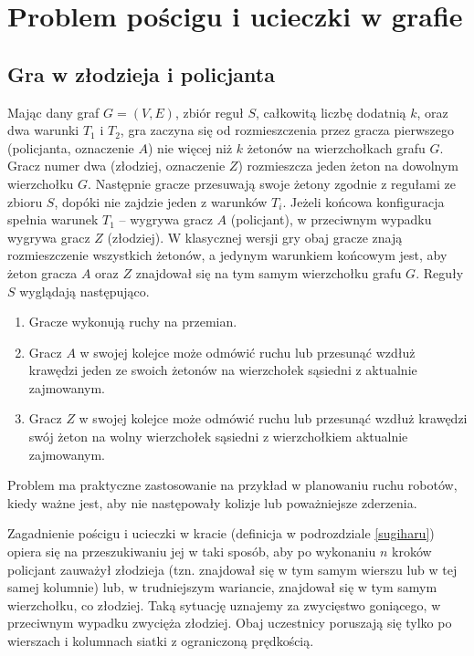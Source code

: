 \documentclass{xmgr}
\theoremstyle{definition}
\begin{document}
\chapter{Problem pościgu i ucieczki w grafie}
\section{Gra w złodzieja i policjanta}\label{sec:poscig}
Mając dany graf $G=(V,E)$, zbiór reguł $S$, całkowitą liczbę dodatnią $k$, oraz dwa warunki $T_1$ i $T_2$, gra zaczyna się od rozmieszczenia przez gracza pierwszego (policjanta, oznaczenie $A$) nie więcej niż $k$ żetonów na wierzchołkach grafu $G$. Gracz numer dwa (złodziej, oznaczenie $Z$) rozmieszcza jeden żeton na dowolnym wierzchołku $G$. Następnie gracze przesuwają swoje żetony zgodnie z regułami ze zbioru $S$, dopóki nie zajdzie jeden z warunków $T_i$. Jeżeli końcowa konfiguracja spełnia warunek $T_1$ -- wygrywa gracz $A$ (policjant), w przeciwnym wypadku wygrywa gracz $Z$ (złodziej). W klasycznej wersji gry \cite{aigner} obaj gracze znają rozmieszczenie wszystkich żetonów, a jedynym warunkiem końcowym jest, aby żeton gracza $A$ oraz $Z$ znajdował się na tym samym wierzchołku grafu $G$.
Reguły $S$ wyglądają następująco.
\begin{enumerate}
  \item Gracze wykonują ruchy na przemian.
  \item Gracz $A$ w swojej kolejce może odmówić ruchu lub przesunąć wzdłuż krawędzi jeden ze swoich żetonów na wierzchołek sąsiedni z aktualnie zajmowanym.
  \item Gracz $Z$ w swojej kolejce może odmówić ruchu lub przesunąć wzdłuż krawędzi swój żeton na wolny wierzchołek sąsiedni z wierzchołkiem aktualnie zajmowanym.
\end{enumerate}

Problem ma praktyczne zastosowanie na przykład w planowaniu ruchu robotów, kiedy ważne jest, aby nie następowały kolizje lub poważniejsze zderzenia.

Zagadnienie pościgu i ucieczki w kracie (definicja w podrozdziale \ref{sugiharu}) opiera się na przeszukiwaniu jej w taki sposób, aby po wykonaniu $n$ kroków policjant zauważył złodzieja (tzn. znajdował się w tym samym wierszu lub w tej samej kolumnie) lub, w trudniejszym wariancie, znajdował się w tym samym wierzchołku, co złodziej. Taką sytuację uznajemy za zwycięstwo goniącego, w przeciwnym wypadku zwycięża złodziej. Obaj uczestnicy poruszają się tylko po wierszach i kolumnach siatki z ograniczoną prędkością.
\end{document}
